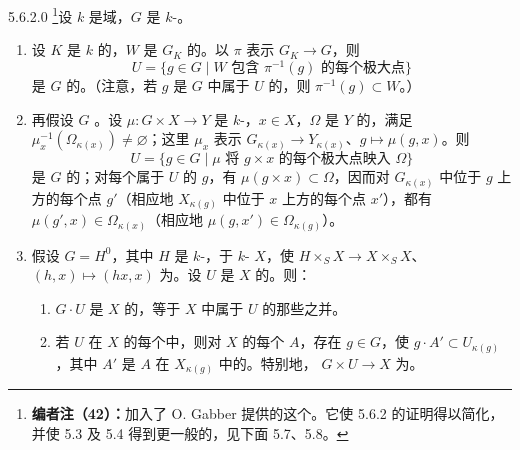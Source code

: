 \begin{SGAresult}{}{5.6.2.0}
\footnote{\textbf{编者注（42）：}加入了 O. Gabber 提供的这个。它使 5.6.2 的证明得以简化，并使 5.3 及 5.4 得到更一般的，见下面 5.7、5.8。}设 $k$ 是域，$G$ 是 $k$-。
\begin{enumerate}
\item[(i)] 设 $K$ 是 $k$ 的，$W$ 是 $G_K$ 的。以 $\pi$ 表示 $G_K\to G$，则
\[
U=\{g\in G\mid W\text{ 包含 }\pi^{-1}(g)\text{ 的每个极大点}\}
\]
是 $G$ 的。（注意，若 $g$ 是 $G$ 中属于 $U$ 的，则 $\pi^{-1}(g)\subset W$。）
\item[(ii)] 再假设 $G$ 。设 $\mu:G\times X\to Y$ 是 $k$-，$x\in X$，$\Omega$ 是 $Y$ 的，满足 $\mu_x^{-1}(\Omega_{\kappa(x)})\ne\varnothing$；这里 $\mu_x$ 表示 $G_{\kappa(x)}\to Y_{\kappa(x)}$、$g\mapsto\mu(g,x)$。则
\[
U=\{g\in G\mid\mu\text{ 将 }g\times x\text{ 的每个极大点映入 }\Omega\}
\]
是 $G$ 的；对每个属于 $U$ 的 $g$，有 $\mu(g\times x)\subset\Omega$，因而对 $G_{\kappa(x)}$ 中位于 $g$ 上方的每个点 $g'$（相应地 $X_{\kappa(g)}$ 中位于 $x$ 上方的每个点 $x'$），都有 $\mu(g',x)\in\Omega_{\kappa(x)}$（相应地 $\mu(g,x')\in\Omega_{\kappa(g)}$）。
\item[(iii)] 假设 $G=H^0$，其中 $H$ 是 $k$-，于 $k$- $X$，使 $H\times_SX\to X\times_SX$、$(h,x)\mapsto(hx,x)$ 为。设 $U$ 是 $X$ 的。则：
\begin{enumerate}
\item[(a)] $G\cdot U$ 是 $X$ 的，等于 $X$ 中属于 $U$ 的那些之并。
\item[(b)] 若 $U$ 在 $X$ 的每个中，则对 $X$ 的每个 $A$，存在 $g\in G$，使 $g\cdot A'\subset U_{\kappa(g)}$，其中 $A'$ 是 $A$ 在 $X_{\kappa(g)}$ 中的。特别地， $G\times U\to X$ 为。
\end{enumerate}
\end{enumerate}
\end{SGAresult}
